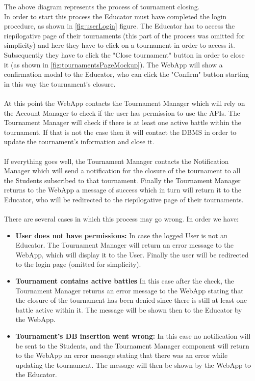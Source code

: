 \documentclass{article}
\begin{document}
{        The above diagram represents the process of tournament closing. \\
        In order to start this process the Educator must have completed the login procedure, as shown in \ref{fig:userLogin} figure.
        The Educator has to access the riepilogative page of their tournaments 
        (this part of the process was omitted for simplicity) and here they have to click 
        on a tournament in order to access it. Subsequently they have to click the "Close tournament" button
        in order to close it (as shown in \ref{fig:tournamentsPageMockup}).
        The WebApp will show a confirmation modal to the Educator, who can click the "Confirm"
        button starting in this way the tournament's closure.
        \\ \\
        At this point the WebApp contacts the Tournament Manager which will rely on the Account
        Manager to check if the user has permission to use the APIs.
        The Tournament Manager will check if there is at least one active battle within the
        tournament. If that is not the case then it will contact the DBMS in order to update the
        tournament's information and close it.
        \\ \\
        If everything goes well, the Tournament Manager contacts the Notification
        Manager which will send a notification for the closure of the tournament to all the 
        Students subscribed to that tournament.
        Finally the Tournament Manager returns to the WebApp a message of success
        which in turn will return it to the Educator, who will be redirected to the 
        riepilogative page of their tournaments.
        \\ \\
        There are several cases in which this process may go wrong. In order we have:
        \begin{itemize}
            \item \textbf{User does not have permissions:} In case the logged User is not an
            Educator. The Tournament Manager will return an
            error message to the WebApp, which will display it to the User.
            Finally the user will be redirected to the login page (omitted for simplicity).
            \item \textbf{Tournament contains active battles} In this case after the check, the 
            Tournament Manager returns an error message to the WebApp stating 
            that the closure of the tournament has been denied since there is still at least
            one battle active within it. The message will be shown then to the Educator by the 
            WebApp.
            \item \textbf{Tournament's DB insertion went wrong:} In this case no 
            notification will be sent to the Students, and the Tournament Manager component will 
            return to the WebApp an error message stating that there was an error while 
            updating the tournament.
            The message will then be shown by the WebApp to the Educator.
        \end{itemize}


}
\end{document}

